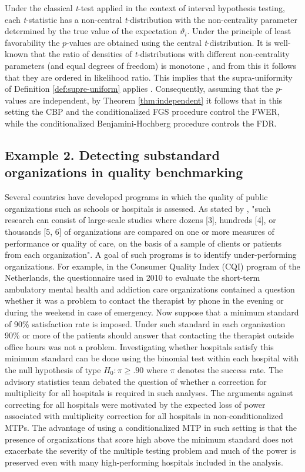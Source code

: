 \documentclass {imsart}
\begin{document}
Under the classical \textit{t}-test applied in the context of interval hypothesis testing, each \textit{t}-statistic has a non-central \textit{t}-distribution with the non-centrality parameter determined by the true value of the expectation $\vartheta_i$. Under the principle of least favorability the $p$-values are obtained using the central \textit{t}-distribution. It is well-known that the ratio of densities of \textit{t}-distributions with different non-centrality parameters (and equal degrees of freedom) is monotone \citep{Kruskall1954,Lehmann1955}, and from this it follows that they are ordered in likelihood ratio. This implies that the supra-uniformity of Definition \ref{def:supre-uniform} applies \citep{Whitt1980, Whitt1982, Denuit2005}. Consequently, assuming that the $p$-values are independent, by Theorem \ref{thm:independent} it follows that in this setting the CBP and the conditionalized FGS procedure control the FWER, while the conditionalized Benjamini-Hochberg procedure \citep{BH1995,BY2001} controls the FDR.


\subsection{Example 2. Detecting substandard organizations in quality benchmarking}

Several countries have developed programs in which the quality of public organizations such as schools or hospitals is assessed. As stated by \citet{Ellis2013}, "such research can consist of large-scale studies where dozens [3], hundreds [4], or thousands [5, 6] of organizations are compared on one or more measures of performance or quality of care, on the basis of a sample of clients or patients from each organization". A goal of such programs is to identify under-performing organizations. For example, in the Consumer Quality Index (CQI) program of the Netherlands, the questionnaire used in 2010 to evaluate the short-term ambulatory mental health and addiction care organizations contained a question whether it was a problem to contact the therapist by phone in the evening or during the weekend in case of emergency. Now suppose that a minimum standard of 90\% satisfaction rate is imposed. Under such standard in each organization 90\% or more of the patients should answer that contacting the therapist outside office hours was not a problem. Investigating whether hospitals satisfy this minimum standard can be done using the binomial test within each hospital with the null hypothesis of type $H_0:\pi\ge.90$ where $\pi$ denotes the success rate. The advisory statistics team debated the question of whether a correction for multiplicity for all hospitals is required in such analyses. The arguments against correcting for all hospitals were motivated by the expected loss of power associated with multiplicity correction for all hospitals in non-conditionalized MTPs. The advantage of using a conditionalized MTP in such setting is that the presence of organizations that score high above the minimum standard does not exacerbate the severity of the multiple testing problem and much of the power is preserved even with many high-performing hospitals included in the analysis.
\end{document}

